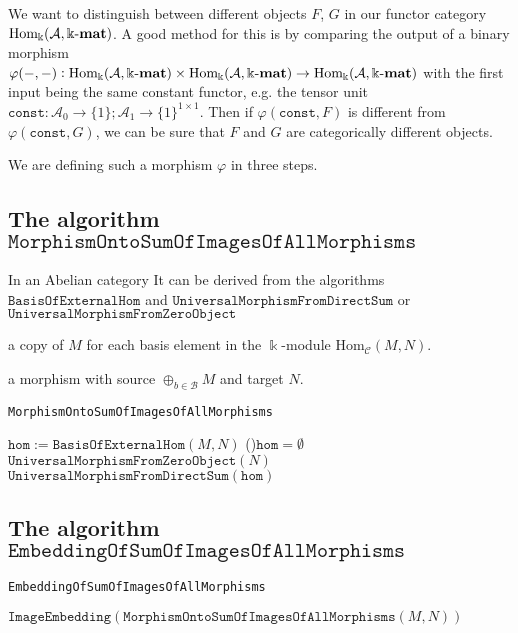 
We want to distinguish between different objects $F$, $G$ in our functor category $\mathrm{Hom_{\Bbbk}}(\mathcal{A},\Bbbk\textnormal{-}\mathbf{mat})$. A good method for this is by comparing the output of a
binary morphism\\
$\varphi( -, - ) : \mathrm{Hom_{\Bbbk}}(\mathcal{A},\Bbbk\textnormal{-}\mathbf{mat}) \times \mathrm{Hom_{\Bbbk}}(\mathcal{A},\Bbbk\textnormal{-}\mathbf{mat}) \rightarrow \mathrm{Hom_{\Bbbk}}(\mathcal{A},\Bbbk\textnormal{-}\mathbf{mat})$ with the first input being the same constant functor,
e.g. the tensor unit $\mathtt{const} : \mathcal{A}_{0} \rightarrow \{1\}; \mathcal{A}_{1} \rightarrow \{1\}^{1\times 1}$.
Then if $\varphi( \mathtt{const}, F )$ is different from $\varphi( \mathtt{const}, G )$, we can be sure that $F$ and $G$ are categorically different objects.

We are defining such a morphism $\varphi$ in three steps.

\subsection{The algorithm $\mathtt{MorphismOntoSumOfImagesOfAllMorphisms}$}
In an Abelian category 
{It can be derived from the algorithms
$\mathtt{BasisOfExternalHom}$ and $\mathtt{UniversalMorphismFromDirectSum}$ or $\mathtt{UniversalMorphismFromZeroObject}$}

a copy of $M$ for each basis element in the $\Bbbk$-module $\mathrm{Hom}_{\mathcal{C}}(M,N)$.

a morphism with source $\oplus_{b \in \mathcal{B}} M$ and target $N$.\\

\begin{algorithm}[H]\capstart
    \caption{\texttt{MorphismOntoSumOfImagesOfAllMorphisms}}\label{algo:MorphismOntoSumOfImagesOfAllMorphisms}
	\BlankLine
	$\mathtt{hom} := \mathtt{BasisOfExternalHom}( M, N )$\;
	\If(){$\mathtt{hom} = \emptyset$}{
	    \Return $\mathtt{UniversalMorphismFromZeroObject}( N )$\;
	}
	\BlankLine
	\Return $\mathtt{UniversalMorphismFromDirectSum}( \mathtt{hom} )$\;
\end{algorithm}

\subsection{The algorithm $\mathtt{EmbeddingOfSumOfImagesOfAllMorphisms}$}

\begin{algorithm}[H]\capstart
    \caption{\texttt{EmbeddingOfSumOfImagesOfAllMorphisms}}\label{algo:EmbeddingOfSumOfImagesOfAllMorphisms}
	\BlankLine
	\Return $\mathtt{ImageEmbedding}( \mathtt{MorphismOntoSumOfImagesOfAllMorphisms}( M, N ) )$\;
\end{algorithm}

